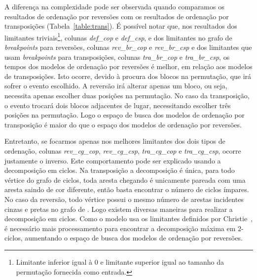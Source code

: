 A diferença na complexidade pode ser observada quando comparamos os
resultados de ordenação por reversões com os resultados de ordenação por
transposições (Tabela~\ref{table:trans}). É possível notar que, nos
resultados dos limitantes triviais\footnote{Limitante inferior igual à
$0$ e limitante superior igual ao tamanho da permutação fornecida como
entrada.}, colunas \textit{def\_cop} e \textit{def\_csp}, e dos
limitantes no grafo de \textit{breakpoints} para reversões, colunas
\textit{rev\_br\_cop} e \textit{rev\_br\_csp} e dos limitantes que usam
\textit{breakpoints} para transposições, colunas \textit{tra\_br\_cop} e
\textit{tra\_br\_csp}, os tempos dos modelos de ordenação por reversões
é melhor, em relação aos modelos de transposições. Isto ocorre, devido à
procura dos blocos na permutação, que irá sofrer o evento escolhido. A
reversão irá alterar apenas um bloco, ou seja, necessita apenas escolher
duas posições na permutação. No caso da transposição, o evento trocará
dois blocos adjacentes de lugar, necessitando escolher três posições na
permutação. Logo o espaço de busca dos modelos de ordenação por
transposição é maior do que o espaço dos modelos de ordenação por
reversões.

Entretanto, se focarmos apenas nos melhores limitantes dos dois tipos de
ordenação, colunas \textit{rev\_cg\_cop}, \textit{rev\_cg\_csp},
\textit{tra\_cg\_cop} e \textit{tra\_cg\_csp}, ocorre justamente o
inverso. Este comportamento pode ser explicado usando a decomposição em
ciclos. Na transposição a decomposição é única, para todo vértice do
grafo de ciclos, toda aresta chegando é unicamente pareada com uma
aresta saindo de cor diferente, então basta encontrar o número de ciclos
ímpares. No caso da reversão, todo vértice possui o mesmo número de
arestas incidentes cinzas e pretas no grafo de \bkp{}. Logo existem
diversas maneiras para realizar a decomposição em ciclos. Como o modelo
usa os limitantes definidos por Christie~\cite{Christie*1998}, é
necessário mais processamento para encontrar a decomposição máxima em
$2$-ciclos, aumentando o espaço de busca dos modelos de ordenação por
reversões.

